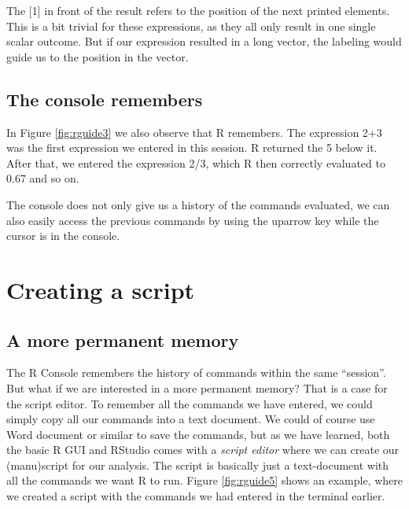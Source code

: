 \documentclass[]{book}
\begin{document}
The {[}1{]} in front of the result refers to the position of the next printed elements. This is a bit trivial for these expressions, as they all only result in one single scalar outcome. But if our expression resulted in a long vector, the labeling would guide us to the position in the vector.

\hypertarget{the-console-remembers}{%
\subsection*{The console remembers}\label{the-console-remembers}}

In Figure \ref{fig:rguide3} we also observe that R remembers. The expression 2+3 was the first expression we entered in this session. R returned the 5 below it. After that, we entered the expression 2/3, which R then correctly evaluated to 0.67 and so on.

The console does not only give us a history of the commands evaluated, we can also easily access the previous commands by using the uparrow key while the cursor is in the console.

\hypertarget{creating-a-script}{%
\section{Creating a script}\label{creating-a-script}}

\hypertarget{a-more-permanent-memory}{%
\subsection*{A more permanent memory}\label{a-more-permanent-memory}}

The R Console remembers the history of commands within the same ``session''. But what if we are interested in a more permanent memory? That is a case for the script editor. To remember all the commands we have entered, we could simply copy all our commands into a text document. We could of course use Word document or similar to save the commands, but as we have learned, both the basic R GUI and RStudio comes with a \emph{script editor} where we can create our (manu)script for our analysis. The script is basically just a text-document with all the commands we want R to run. Figure \ref{fig:rguide5} shows an example, where we created a script with the commands we had entered in the terminal earlier.
\end{document}
